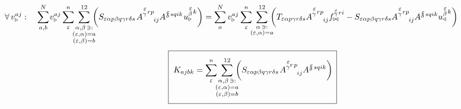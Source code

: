 \begin{equation}
   \hspace{-18mm}
   \forall \, v^{a j}_{\triangleright}: \quad
   \sum^N_{a,b} \mkern-2mu v^{a  j}_{\triangleright}
   \sum^n_\varepsilon
   \mkern-7mu
   \sum_{\substack{\alpha, \beta \, \ni: \\ (\varepsilon,\alpha) = a \\ (\varepsilon,\beta) = b}}^{12}
   \mkern-10mu
   \qty(
   S_{\varepsilon   \alpha p   \beta q   \gamma r   \delta s} \mkern2mu
   A^{\substack{\mkern2mu \varepsilon \\[0.12mm] \gamma} \mkern2mu r p}_{\mkern29mu i j}
   A^{\substack{\mkern2mu \varepsilon \\[-0.59mm] \delta} \mkern2mu s q i k} \mkern1mu
   u^{\substack{\mkern2mu \varepsilon \\[0.14mm] \beta} \mkern2mu k}_\triangleright )
   =
   \sum^N_a v^{a j}_{\triangleright}
   \sum^n_\varepsilon
   \mkern-7mu
   \sum_{\substack{\alpha \, \ni: \\ (\varepsilon,\alpha) = a}}^{12}
   \mkern-10mu
   \qty(
   T_{\varepsilon   \alpha p   \gamma r   \delta s}
   A^{\substack{\mkern2mu \varepsilon \\[0.12mm] \gamma} \mkern2mu r p}_{\mkern29mu i j}
   f^{\substack{\mkern2mu \varepsilon \\[-0.59mm] \gamma} \mkern2mu r i}_{\bowtie}
   -
   S_{\varepsilon   \alpha p   \beta q   \gamma r   \delta s}
   A^{\substack{\mkern2mu \varepsilon \\[0.12mm] \gamma} \mkern2mu r p}_{\mkern29mu i j}
   A^{\substack{\mkern2mu \varepsilon \\[-0.59mm] \delta} \mkern2mu s q i k}
   u^{\substack{\mkern2mu \varepsilon \\[0.14mm] \beta} \mkern2mu k}_\triangleleft )
\end{equation}
\begin{equation}
   \boxed{ \phantom{\rule[-12mm]{1mm}{20mm}}
   K_{ajbk} =
   \sum^n_\varepsilon
   \mkern-7mu
   \sum_{\substack{\alpha, \beta \, \ni: \\ (\varepsilon,\alpha) = a \\ (\varepsilon,\beta) = b}}^{12}
   \mkern-10mu
   \qty(
   S_{\varepsilon   \alpha p   \beta q   \gamma r   \delta s} \mkern2mu
   A^{\substack{\mkern2mu \varepsilon \\[0.12mm] \gamma} r \mkern2mu p}_{\mkern29mu i j}
   A^{\substack{\mkern2mu \varepsilon \\[-0.59mm] \delta} \mkern2mu  s q i k} ) \mkern3mu }
\end{equation}
